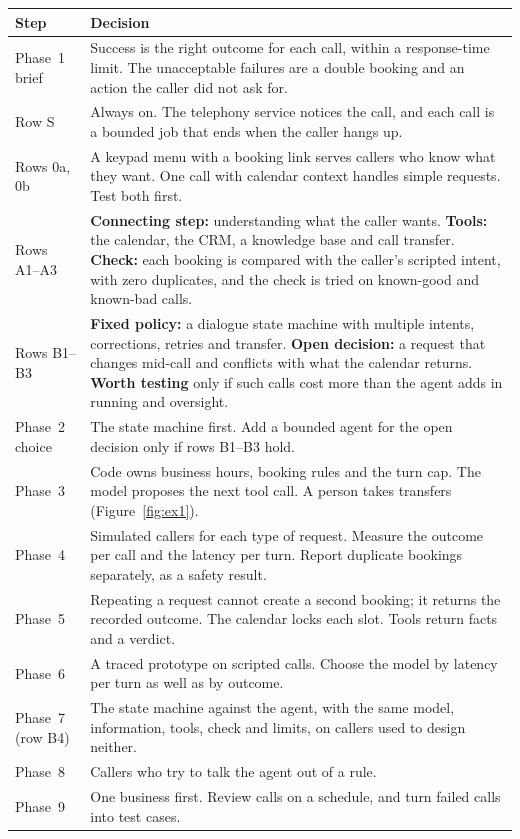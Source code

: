 \documentclass[10pt]{article}
\begin{document}
\begin{center}
\small
\begin{tabularx}{\linewidth}{@{}p{2.7cm} L@{}}
\toprule
Step & Decision \\
\midrule
Phase~1 brief & Success is the right outcome for each call, within a response-time limit. The unacceptable failures are a double booking and an action the caller did not ask for. \\
Row S & Always on. The telephony service notices the call, and each call is a bounded job that ends when the caller hangs up. \\
Rows 0a, 0b & A keypad menu with a booking link serves callers who know what they want. One call with calendar context handles simple requests. Test both first. \\
Rows A1--A3 & \textbf{Connecting step:} understanding what the caller wants. \textbf{Tools:} the calendar, the CRM, a knowledge base and call transfer. \textbf{Check:} each booking is compared with the caller's scripted intent, with zero duplicates, and the check is tried on known-good and known-bad calls. \\
Rows B1--B3 & \textbf{Fixed policy:} a dialogue state machine with multiple intents, corrections, retries and transfer. \textbf{Open decision:} a request that changes mid-call and conflicts with what the calendar returns. \textbf{Worth testing} only if such calls cost more than the agent adds in running and oversight. \\
Phase~2 choice & The state machine first. Add a bounded agent for the open decision only if rows B1--B3 hold. \\
Phase~3 & Code owns business hours, booking rules and the turn cap. The model proposes the next tool call. A person takes transfers (Figure~\ref{fig:ex1}). \\
Phase~4 & Simulated callers for each type of request. Measure the outcome per call and the latency per turn. Report duplicate bookings separately, as a safety result. \\
Phase~5 & Repeating a request cannot create a second booking; it returns the recorded outcome. The calendar locks each slot. Tools return facts and a verdict. \\
Phase~6 & A traced prototype on scripted calls. Choose the model by latency per turn as well as by outcome. \\
Phase~7 (row B4) & The state machine against the agent, with the same model, information, tools, check and limits, on callers used to design neither. \\
Phase~8 & Callers who try to talk the agent out of a rule. \\
Phase~9 & One business first. Review calls on a schedule, and turn failed calls into test cases. \\
\bottomrule
\end{tabularx}
\end{center}
\end{document}
